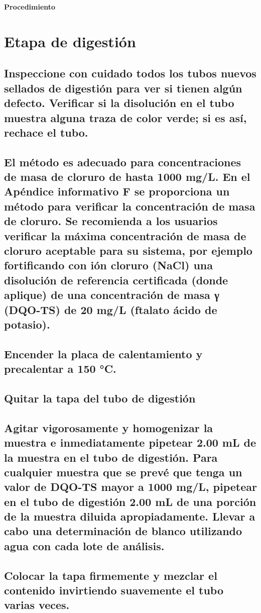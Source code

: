 \documentclass[spanish,12pt,letterpaper,titlepage]{article}
\theoremstyle{definition}
\begin{document}
	\Large{\textbf{Procedimiento}}
	\normalsize
	\section{Etapa de digestión} \label{10.1}
	\subsection{Inspeccione con cuidado todos los tubos nuevos sellados de digestión para ver si tienen algún defecto. Verificar si la disolución en el tubo muestra alguna traza de color verde; si es así, rechace el tubo.} \label{10.1.1}
	\subsection{El método es adecuado para concentraciones de masa de cloruro de hasta 1000 mg/L. En el Apéndice informativo F se proporciona un método para verificar la concentración de masa de cloruro. Se recomienda a los usuarios verificar la máxima concentración de masa de cloruro aceptable para su sistema, por ejemplo fortificando con ión cloruro (NaCl) una disolución de referencia certificada (donde aplique) de una concentración de masa γ (DQO-TS) de 20 mg/L (ftalato ácido de potasio).} \label{10.1.2}
	\subsection{Encender la placa de calentamiento y precalentar a 150 °C.} \label{10.1.3}
	\subsection{Quitar la tapa del tubo de digestión} \label{10.1.4}
	\subsection{Agitar vigorosamente y homogenizar la muestra e inmediatamente pipetear 2.00 mL de la muestra en el tubo de digestión. Para cualquier muestra que se prevé que tenga un valor de DQO-TS mayor a 1000 mg/L, pipetear en el tubo de digestión 2.00 mL de una porción de la muestra diluida apropiadamente. Llevar a cabo una determinación de blanco utilizando agua con cada lote de análisis.} \label{10.1.5}
	\subsection{Colocar la tapa firmemente y mezclar el contenido invirtiendo suavemente el tubo varias veces.} \label{10.1.6}
\end{document}
